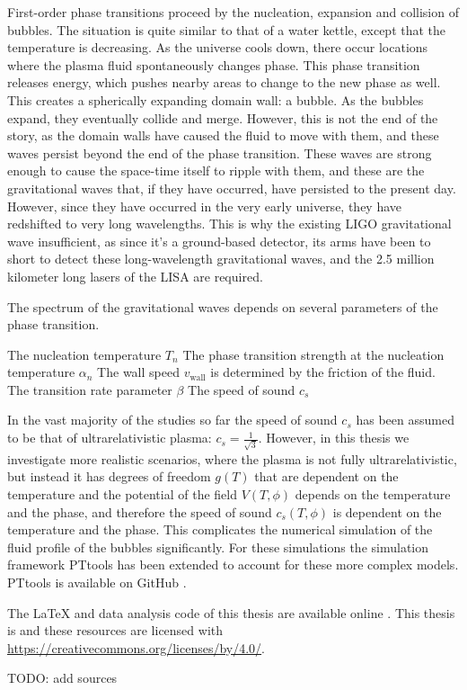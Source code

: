 First-order phase transitions proceed by the nucleation, expansion and collision of bubbles.
The situation is quite similar to that of a water kettle,
except that the temperature is decreasing.
As the universe cools down,
there occur locations where the plasma fluid spontaneously changes phase.
This phase transition releases energy, which pushes nearby areas to change to the new phase as well.
This creates a spherically expanding domain wall: a bubble.
As the bubbles expand, they eventually collide and merge.
However, this is not the end of the story, as the domain walls have caused the fluid to move with them,
and these waves persist beyond the end of the phase transition.
These waves are strong enough to cause the space-time itself to ripple with them,
and these are the gravitational waves that, if they have occurred, have persisted to the present day.
However, since they have occurred in the very early universe, they have redshifted to very long wavelengths.
This is why the existing LIGO gravitational wave insufficient,
as since it's a ground-based detector, its arms have been to short to detect these long-wavelength gravitational waves,
and the 2.5 million kilometer long lasers of the LISA are required.

The spectrum of the gravitational waves depends on several parameters of the phase transition.

The nucleation temperature $T_n$
The phase transition strength at the nucleation temperature $\alpha_n$
The wall speed $v_{\text{wall}}$ is determined by the friction of the fluid.
The transition rate parameter $\beta$
The speed of sound $c_s$

In the vast majority of the studies so far the speed of sound $c_s$ has been assumed to be that of ultrarelativistic plasma: $c_s = \frac{1}{\sqrt{3}}$.
However, in this thesis we investigate more realistic scenarios, where the plasma is not fully ultrarelativistic,
but instead it has degrees of freedom $g(T)$ that are dependent on the temperature and the potential of the field $V(T,\phi)$ depends on the temperature and the phase, and therefore the speed of sound $c_s(T,\phi)$ is dependent on the temperature and the phase.
This complicates the numerical simulation of the fluid profile of the bubbles significantly.
For these simulations the simulation framework PTtools has been extended to account for these more complex models.
PTtools is available on GitHub \cite{pttools}.

The LaTeX and data analysis code of this thesis are available online \cite{thesis_source}.
This thesis is and these resources are licensed with
\href{Creative Commons Attribution 4.0 International}{https://creativecommons.org/licenses/by/4.0/}.

TODO: add sources

